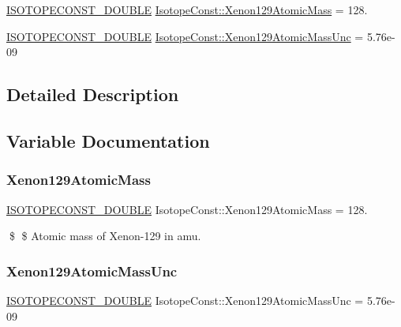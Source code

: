 \begin{DoxyCompactItemize}
\item 
\mbox{\hyperlink{group___isotope_const-_macros_ga8f45a7272ce02c0b4c65c44636ed719a}{I\+S\+O\+T\+O\+P\+E\+C\+O\+N\+S\+T\+\_\+\+D\+O\+U\+B\+LE}} \mbox{\hyperlink{group___isotope_const-_xenon-_xe129_gabf90e35d478c1c2364a3b69fde5b002b}{Isotope\+Const\+::\+Xenon129\+Atomic\+Mass}} = 128.
\item 
\mbox{\hyperlink{group___isotope_const-_macros_ga8f45a7272ce02c0b4c65c44636ed719a}{I\+S\+O\+T\+O\+P\+E\+C\+O\+N\+S\+T\+\_\+\+D\+O\+U\+B\+LE}} \mbox{\hyperlink{group___isotope_const-_xenon-_xe129_ga9534d7d19a6efe4d41cf50cb02d112e6}{Isotope\+Const\+::\+Xenon129\+Atomic\+Mass\+Unc}} = 5.\+76e-\/09
\end{DoxyCompactItemize}


\subsection{Detailed Description}


\subsection{Variable Documentation}
\mbox{\label{group___isotope_const-_xenon-_xe129_gabf90e35d478c1c2364a3b69fde5b002b}} 
\subsubsection{\texorpdfstring{Xenon129\+Atomic\+Mass}{Xenon129AtomicMass}}
{\footnotesize\ttfamily \mbox{\hyperlink{group___isotope_const-_macros_ga8f45a7272ce02c0b4c65c44636ed719a}{I\+S\+O\+T\+O\+P\+E\+C\+O\+N\+S\+T\+\_\+\+D\+O\+U\+B\+LE}} Isotope\+Const\+::\+Xenon129\+Atomic\+Mass = 128.}

\$ \$ Atomic mass of Xenon-\/129 in amu. \mbox{\label{group___isotope_const-_xenon-_xe129_ga9534d7d19a6efe4d41cf50cb02d112e6}} 
\subsubsection{\texorpdfstring{Xenon129\+Atomic\+Mass\+Unc}{Xenon129AtomicMassUnc}}
{\footnotesize\ttfamily \mbox{\hyperlink{group___isotope_const-_macros_ga8f45a7272ce02c0b4c65c44636ed719a}{I\+S\+O\+T\+O\+P\+E\+C\+O\+N\+S\+T\+\_\+\+D\+O\+U\+B\+LE}} Isotope\+Const\+::\+Xenon129\+Atomic\+Mass\+Unc = 5.\+76e-\/09}

